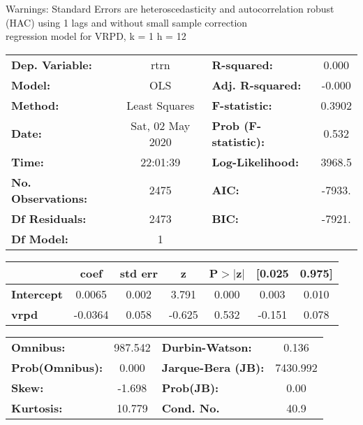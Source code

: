 Warnings: \newline
 [1] Standard Errors are heteroscedasticity and autocorrelation robust (HAC) using 1 lags and without small sample correction\\ 

regression model for VRPD, k = 1 h = 12\begin{center}
\begin{tabular}{lclc}
\toprule
\textbf{Dep. Variable:}    &       rtrn       & \textbf{  R-squared:         } &     0.000   \\
\textbf{Model:}            &       OLS        & \textbf{  Adj. R-squared:    } &    -0.000   \\
\textbf{Method:}           &  Least Squares   & \textbf{  F-statistic:       } &    0.3902   \\
\textbf{Date:}             & Sat, 02 May 2020 & \textbf{  Prob (F-statistic):} &    0.532    \\
\textbf{Time:}             &     22:01:39     & \textbf{  Log-Likelihood:    } &    3968.5   \\
\textbf{No. Observations:} &        2475      & \textbf{  AIC:               } &    -7933.   \\
\textbf{Df Residuals:}     &        2473      & \textbf{  BIC:               } &    -7921.   \\
\textbf{Df Model:}         &           1      & \textbf{                     } &             \\
\bottomrule
\end{tabular}
\begin{tabular}{lcccccc}
                   & \textbf{coef} & \textbf{std err} & \textbf{z} & \textbf{P$> |$z$|$} & \textbf{[0.025} & \textbf{0.975]}  \\
\midrule
\textbf{Intercept} &       0.0065  &        0.002     &     3.791  &         0.000        &        0.003    &        0.010     \\
\textbf{vrpd}      &      -0.0364  &        0.058     &    -0.625  &         0.532        &       -0.151    &        0.078     \\
\bottomrule
\end{tabular}
\begin{tabular}{lclc}
\textbf{Omnibus:}       & 987.542 & \textbf{  Durbin-Watson:     } &    0.136  \\
\textbf{Prob(Omnibus):} &   0.000 & \textbf{  Jarque-Bera (JB):  } & 7430.992  \\
\textbf{Skew:}          &  -1.698 & \textbf{  Prob(JB):          } &     0.00  \\
\textbf{Kurtosis:}      &  10.779 & \textbf{  Cond. No.          } &     40.9  \\
\bottomrule
\end{tabular}
\end{center}

